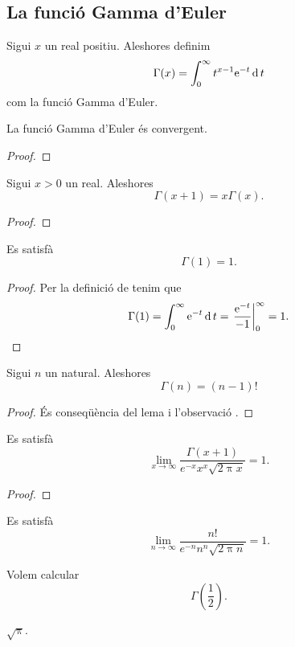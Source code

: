 \documentclass[../../Main.tex]{subfiles}
\begin{document}
	\subsection{La funció Gamma d'Euler}
	\begin{definition}
		\label{def:Gamma d'Euler}
		Sigui \(x\) un real positiu. Aleshores definim
		\[\Gamma(x)=\int_{0}^{\infty}t^{x-1}\mathrm{e}^{-t}\operatorname{d} t\]
		com la funció Gamma d'Euler.
	\end{definition}
	\begin{theorem}
		\label{thm:la funció Gamma d'Euler és convergent}
		La funció Gamma d'Euler és convergent.
		\begin{proof}
		\end{proof}
	\end{theorem}
	\begin{lemma} %
		\label{lema:la Gamma d'Euler es comporta com un factorial amb reals}
		Sigui \(x>0\) un real. Aleshores
		\[\Gamma(x+1)=x\Gamma(x).\]
		\begin{proof}
		\end{proof}
	\end{lemma}
	\begin{observation}
		\label{obs:valor n=1 per la Gamma d'Euler}
		Es satisfà
		\[\Gamma(1)=1.\]
		\begin{proof} %
			Per la definició de  tenim que
			\[\Gamma(1)=\int_{0}^{\infty}\e^{-t}\diff t=\left.\frac{\e^{-t}}{-1}\right\vert_{0}^{\infty}=1.\qedhere\]
		\end{proof}
	\end{observation}
	\begin{lemma} %
		\label{lema:la Gamma d'Euler es comporta com un factorial}
		Sigui \(n\) un natural. Aleshores
		\[\Gamma(n)=(n-1)!\]
		\begin{proof}
			És conseqüència del lema  i l'observació .
		\end{proof}
	\end{lemma}
	\begin{theorem}
		\label{thm:fórmula d'Stirling}
		Es satisfà
		\[\lim_{x\to\infty}\frac{\Gamma(x+1)}{e^{-x}x^{x}\sqrt{2\uppi x}}=1.\]
		\begin{proof}
		\end{proof}
	\end{theorem}
	\begin{corollary}
		\label{cor:fórmula d'Stirling}
		Es satisfà
		\[\lim_{n\to\infty}\frac{n!}{e^{-n}n^{n}\sqrt{2\uppi n}}=1.\]
	\end{corollary}
	\begin{example}
		Volem calcular
		\[\Gamma\left(\frac{1}{2}\right).\]
		\begin{solution}
			\(\sqrt{\uppi}\). %
		\end{solution}
	\end{example}
\end{document}
